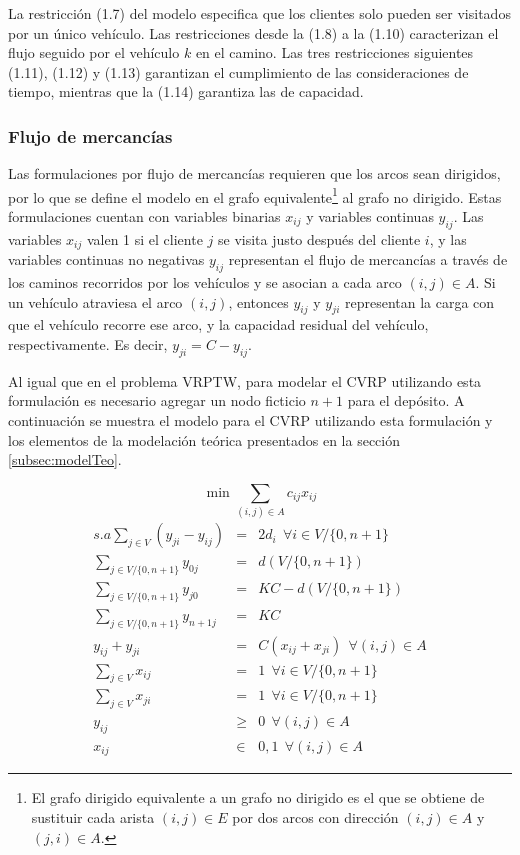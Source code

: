 La restricción (1.7) del modelo especifica que los clientes solo pueden ser visitados por un único vehículo. Las restricciones desde la (1.8) a la (1.10) caracterizan el flujo seguido por el vehículo $k$ en el camino. Las tres restricciones siguientes (1.11), (1.12) y (1.13) garantizan el cumplimiento de las consideraciones de tiempo, mientras que la (1.14) garantiza las de capacidad.

\subsubsection{Flujo de mercancías}
Las formulaciones por flujo de mercancías requieren que los arcos sean dirigidos, por lo que se define el modelo en el grafo equivalente\footnote{El grafo dirigido equivalente a un grafo no dirigido es el que se obtiene de sustituir cada arista $(i, j) \in E$ por dos arcos con dirección $(i, j) \in A$ y $(j, i) \in A$.} al grafo no dirigido. Estas formulaciones cuentan con variables binarias $x_{ij}$ y variables continuas $y_{ij}$. Las variables $x_{ij}$ valen 1 si el cliente $j$ se visita justo después del cliente $i$, y las variables continuas no negativas $y_{ij}$ representan el flujo de mercancías a través de los caminos recorridos por los vehículos y se asocian a cada arco $(i, j) \in A$. Si un vehículo atraviesa el arco $(i, j)$, entonces $y_{ij}$ y $y_{ji}$ representan la carga con que el vehículo recorre ese arco, y la capacidad residual del vehículo, respectivamente. Es decir, $y_{ji} = C - y_{ij}$.

Al igual que en el problema VRPTW, para modelar el CVRP utilizando esta formulación es necesario agregar un nodo ficticio $n + 1$ para el depósito. A continuación se muestra el modelo para el CVRP utilizando esta formulación y los elementos de la modelación teórica presentados en la sección \ref{subsec:modelTeo}.

$$
\min \sum_{(i, j) \in A} c_{ij} x_{ij}
$$
\begin{eqnarray}
s.a \displaystyle{\sum_{j \in V} (y_{ji} - y_{ij})} & = & 2 d_i \ \ \forall i \in V / \{0, n + 1\} \label{m1:1}\\
\displaystyle{\sum_{j \in V / \{0, n + 1\}} y_{0j}} & = & d(V / \{0, n + 1\}) \label{m1:2}\\
\displaystyle{\sum_{j \in V / \{0, n + 1\}} y_{j0}} & = & KC - d(V / \{0, n + 1\}) \label{m1:3}\\
\displaystyle{\sum_{j \in V / \{0, n + 1\}} y_{n + 1 j}} & = & KC \label{m1:4}\\
y_{ij} + y_{ji} & = & C (x_{ij} + x_{ji}) \ \ \forall (i, j) \in A \label{m1:5}\\
\displaystyle{\sum_{j \in V} x_{ij}} & = & 1 \ \ \forall i \in V / \{0, n + 1\} \label{m1:6}\\
\displaystyle{\sum_{j \in V} x_{ji}} & = & 1 \ \ \forall i \in V / \{0, n + 1\} \label{m1:7}\\
y_{ij} & \ge & 0 \ \ \forall (i, j) \in A\\
x_{ij} & \in & {0, 1} \ \ \forall (i, j) \in A
\end{eqnarray}

